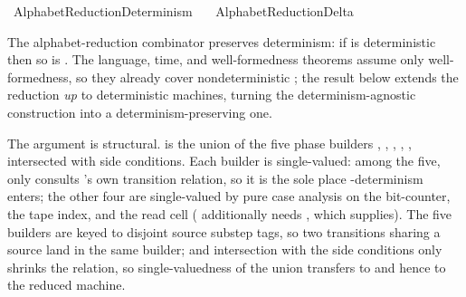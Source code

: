 %
\begin{isabellebody}%
%
%
\isadelimtheory
%
\endisadelimtheory
%
\isatagtheory
{}\isamarkupfalse%
\ AlphabetReduction{\isacharunderscore}{\kern0pt}Determinism\isanewline
\ \ \ AlphabetReduction{\isacharunderscore}{\kern0pt}Delta\isanewline
{}%
\endisatagtheory
{\isafoldtheory}%
%
\isadelimtheory
%
\endisadelimtheory
%
\isadelimdocument
%
\endisadelimdocument
%
\isatagdocument
%
\isamarkuptrue%
%
\endisatagdocument
{\isafolddocument}%
%
\isadelimdocument
%
\endisadelimdocument
%
\begin{isamarkuptext}%
The alphabet-reduction combinator preserves determinism: if
   is deterministic then so is .  The
  language, time, and well-formedness theorems assume only
  well-formedness, so they already cover nondeterministic ;
  the result below extends the reduction \emph{up} to deterministic
  machines, turning the determinism-agnostic construction into a
  determinism-preserving one.

  The argument is structural.   is the
  union of the five phase builders ,
  , ,
  , , intersected with
  side conditions.  Each builder is single-valued: among the five, only
   consults 's own transition
  relation, so it is the sole place -determinism enters; the
  other four are single-valued by pure case analysis on the bit-counter,
  the tape index, and the read cell ( additionally
  needs , which  supplies).  The five
  builders are keyed to disjoint source substep tags, so two transitions
  sharing a source land in the same builder; and intersection with the
  side conditions only shrinks the relation, so single-valuedness of the
  union transfers to  and hence to the
  reduced machine.


\end{isamarkuptext}
\end{isabellebody}
